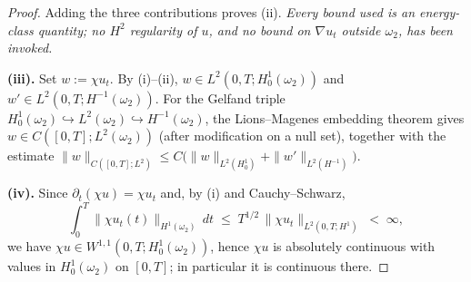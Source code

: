 \documentclass[10pt,a4paper]{amsart}
\begin{document}
\begin{proof}
Adding the three contributions proves (ii). \emph{Every bound used is an energy-class quantity;
no $H^2$ regularity of $u$, and no bound on $\nabla u_t$ outside $\omega_2$, has been invoked.}


\textbf{(iii).} Set $w:=\chi u_t$. By (i)--(ii), $w\in L^2(0,T;H_0^1(\omega_2))$ and \\
$w'\in L^2(0,T;H^{-1}(\omega_2))$. For the Gelfand triple
$H_0^1(\omega_2)\hookrightarrow L^2(\omega_2)\hookrightarrow H^{-1}(\omega_2)$, the
Lions--Magenes embedding theorem gives $w\in C([0,T];L^2(\omega_2))$ (after modification on a
null set), together with the estimate
$\|w\|_{C([0,T];L^2)}\le C\big(\|w\|_{L^2(H_0^1)}+\|w'\|_{L^2(H^{-1})}\big)$.


\textbf{(iv).} Since $\partial_t(\chi u)=\chi u_t$ and, by (i) and Cauchy--Schwarz,
\[
\int_0^{T}\big\|\chi u_t(t)\big\|_{H^1(\omega_2)}\,dt \;\le\; T^{1/2}\,\|\chi u_t\|_{L^2(0,T;H^1)} \;<\;\infty,
\]
we have $\chi u\in W^{1,1}(0,T;H_0^1(\omega_2))$, hence $\chi u$ is absolutely continuous with
values in $H_0^1(\omega_2)$ on $[0,T]$; in particular it is continuous there.
\end{proof}
\end{document}
